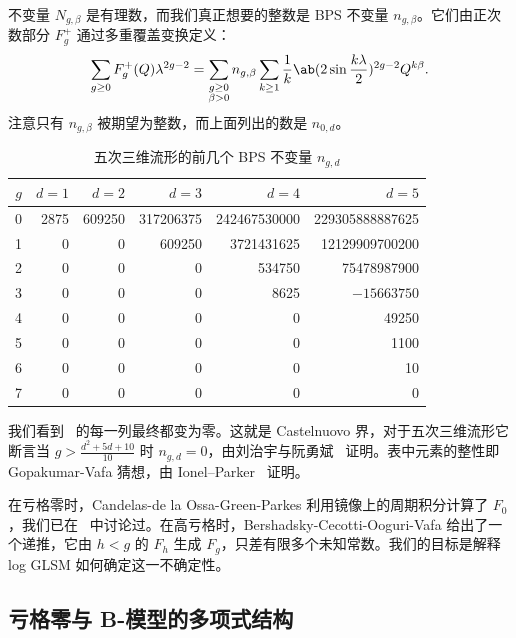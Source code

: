 \documentclass{amsart}
\theoremstyle{definition}
\theoremstyle{remark}
\theoremstyle{plain}
\theoremstyle{definition}
\theoremstyle{remark}
\newcommand{\1}{\mathbf{1}}
\newcommand{\2}{\mathbf{2}}
\newcommand{\3}{\mathbf{3}}
\begin{document}
不变量 \(N_{g,\beta}\) 是有理数，而我们真正想要的整数是 BPS 不变量 \(n_{g,\beta}\)。它们由正次数部分 \(F_g^+\) 通过多重覆盖变换定义：
\[ \sum_{g \geq 0} F_g^+(Q)\lambda^{2g-2} = \sum_{\substack{g \geq 0 \\ \beta > 0}} n_{g,\beta} \sum_{k \geq 1} \frac{1}{k} \ab(2 \sin \frac{k\lambda}{2})^{2g-2}Q^{k\beta}. \]
注意只有 \(n_{g,\beta}\) 被期望为整数，而上面列出的数是 \(n_{0,d}\)。

\begin{table}[htpb]
    \centering
    \caption{五次三维流形的前几个 BPS 不变量 \(n_{g,d}\)}
    \label{tab:quinticbps}
    \begin{tabular}{crrrrr}
        \toprule
        \(g\) & \(d=1\) & \(d=2\) & \(d=3\) & \(d=4\) & \(d=5\) \\
        \midrule
        0 & 2875 & 609250 & 317206375 & 242467530000 & 229305888887625 \\
        1 & 0 & 0 & 609250 & 3721431625 & 12129909700200 \\
        2 & 0 & 0 & 0 & 534750 & 75478987900 \\
        3 & 0 & 0 & 0 & 8625 & \(-15663750\) \\
        4 & 0 & 0 & 0 & 0 & 49250 \\
        5 & 0 & 0 & 0 & 0 & 1100 \\
        6 & 0 & 0 & 0 & 0 & 10 \\
        7 & 0 & 0 & 0 & 0 & 0 \\
        \bottomrule
    \end{tabular}
\end{table}

我们看到~ 的每一列最终都变为零。这就是 Castelnuovo 界，对于五次三维流形它断言当 \(g > \frac{d^2+5d+10}{10}\) 时 \(n_{g,d} = 0\)，由刘治宇与阮勇斌~\cite{LiuRuanCastelnuovo} 证明。表中元素的整性即 Gopakumar-Vafa 猜想，由 Ionel--Parker~\cite{IonelParker2018} 证明。

在亏格零时，Candelas-de la Ossa-Green-Parkes 利用镜像上的周期积分计算了 \(F_0\)，我们已在~ 中讨论过。在高亏格时，Bershadsky-Cecotti-Ooguri-Vafa 给出了一个递推，它由 \(h < g\) 的 \(F_h\) 生成 \(F_g\)，只差有限多个未知常数。我们的目标是解释 log GLSM 如何确定这一不确定性。

\subsection{亏格零与 B-模型的多项式结构}%
\label{sub:Genus zero and the polynomial structure of the B-model}
\end{document}
